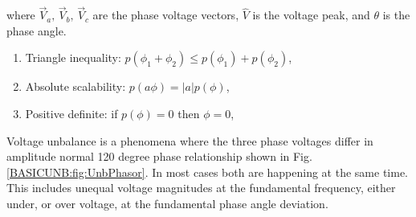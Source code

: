 	where $\vec{V}_a,\,\vec{V}_b,\,\vec{V}_c$ are the phase voltage vectors, $\hat{V}$ is the voltage peak, and $\theta$ is the phase angle.\\
\begin{enumerate}
            \item Triangle inequality: $p(\phi_1+\phi_2)\leq p(\phi_1)+p(\phi_2)$,
            \item Absolute scalability: $p(a\phi)=|a|p(\phi)$,
            \item Positive definite: if $p(\phi)=0$ then $\phi=0$,
\end{enumerate}
 Voltage unbalance is a phenomena where the three phase voltages differ in amplitude normal 120 degree phase relationship shown in Fig.\ref{BASICUNB:fig:UnbPhasor}. In most cases both are happening at the same time. This includes unequal voltage magnitudes at the fundamental frequency, either under, or over voltage, at the fundamental phase angle deviation.
	
